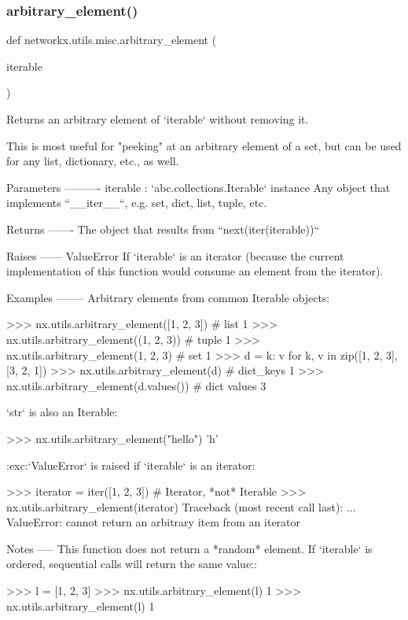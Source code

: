 \subsubsection{\texorpdfstring{arbitrary\+\_\+element()}{arbitrary\_element()}}
{\footnotesize\ttfamily def networkx.\+utils.\+misc.\+arbitrary\+\_\+element (\begin{DoxyParamCaption}\item[{}]{iterable }\end{DoxyParamCaption})}

\begin{DoxyVerb}Returns an arbitrary element of `iterable` without removing it.

This is most useful for "peeking" at an arbitrary element of a set,
but can be used for any list, dictionary, etc., as well.

Parameters
----------
iterable : `abc.collections.Iterable` instance
    Any object that implements ``__iter__``, e.g. set, dict, list, tuple,
    etc.

Returns
-------
The object that results from ``next(iter(iterable))``

Raises
------
ValueError
    If `iterable` is an iterator (because the current implementation of
    this function would consume an element from the iterator).

Examples
--------
Arbitrary elements from common Iterable objects:

>>> nx.utils.arbitrary_element([1, 2, 3])  # list
1
>>> nx.utils.arbitrary_element((1, 2, 3))  # tuple
1
>>> nx.utils.arbitrary_element({1, 2, 3})  # set
1
>>> d = {k: v for k, v in zip([1, 2, 3], [3, 2, 1])}
>>> nx.utils.arbitrary_element(d)  # dict_keys
1
>>> nx.utils.arbitrary_element(d.values())   # dict values
3

`str` is also an Iterable:

>>> nx.utils.arbitrary_element("hello")
'h'

:exc:`ValueError` is raised if `iterable` is an iterator:

>>> iterator = iter([1, 2, 3])  # Iterator, *not* Iterable
>>> nx.utils.arbitrary_element(iterator)
Traceback (most recent call last):
    ...
ValueError: cannot return an arbitrary item from an iterator

Notes
-----
This function does not return a *random* element. If `iterable` is
ordered, sequential calls will return the same value::

    >>> l = [1, 2, 3]
    >>> nx.utils.arbitrary_element(l)
    1
    >>> nx.utils.arbitrary_element(l)
    1\end{DoxyVerb}
 \mbox{\label{namespacenetworkx_1_1utils_1_1misc_a929828e4156160839e8a2f8fb636a0c6}} 
